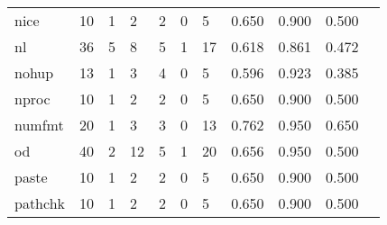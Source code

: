 \begin{longtable}{lp{1.10cm}p{1.10cm}p{1.10cm}p{1.10cm}p{1.10cm}p{1.10cm}p{1.10cm}p{1.10cm}p{1.10cm}p{1.10cm}}
nice      &                     10 &                                  1 &                                 2 &                                2 &                                 0 &                               5 &                          0.650 &                                 0.900 &                               0.500 \\
nl        &                     36 &                                  5 &                                 8 &                                5 &                                 1 &                              17 &                          0.618 &                                 0.861 &                               0.472 \\
nohup     &                     13 &                                  1 &                                 3 &                                4 &                                 0 &                               5 &                          0.596 &                                 0.923 &                               0.385 \\
nproc     &                     10 &                                  1 &                                 2 &                                2 &                                 0 &                               5 &                          0.650 &                                 0.900 &                               0.500 \\
numfmt    &                     20 &                                  1 &                                 3 &                                3 &                                 0 &                              13 &                          0.762 &                                 0.950 &                               0.650 \\
od        &                     40 &                                  2 &                                12 &                                5 &                                 1 &                              20 &                          0.656 &                                 0.950 &                               0.500 \\
paste     &                     10 &                                  1 &                                 2 &                                2 &                                 0 &                               5 &                          0.650 &                                 0.900 &                               0.500 \\
pathchk   &                     10 &                                  1 &                                 2 &                                2 &                                 0 &                               5 &                          0.650 &                                 0.900 &                               0.500 \\

\end{longtable}
